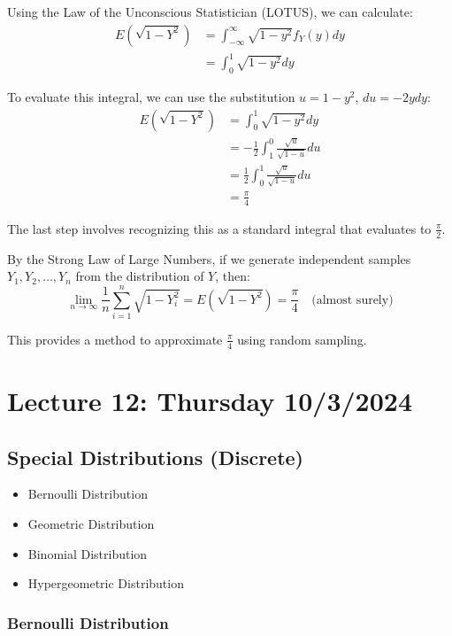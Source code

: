 \documentclass{article}
\begin{document}
    Using the Law of the Unconscious Statistician (LOTUS), we can calculate:
    \begin{align*}
    E(\sqrt{1-Y^2}) &= \int_{-\infty}^{\infty} \sqrt{1-y^2} f_Y(y) dy \\
    &= \int_{0}^{1} \sqrt{1-y^2} dy
    \end{align*}

    To evaluate this integral, we can use the substitution $u = 1-y^2$, $du = -2y dy$:
    \begin{align*}
    E(\sqrt{1-Y^2}) &= \int_{0}^{1} \sqrt{1-y^2} dy \\
    &= -\frac{1}{2} \int_{1}^{0} \frac{\sqrt{u}}{\sqrt{1-u}} du \\
    &= \frac{1}{2} \int_{0}^{1} \frac{\sqrt{u}}{\sqrt{1-u}} du \\
    &= \frac{\pi}{4}
    \end{align*}

    The last step involves recognizing this as a standard integral that evaluates to $\frac{\pi}{2}$.

    By the Strong Law of Large Numbers, if we generate independent samples $Y_1, Y_2, \ldots, Y_n$ from the distribution of $Y$, then:
    \[
    \lim_{n \to \infty} \frac{1}{n} \sum_{i=1}^{n} \sqrt{1-Y_i^2} = E(\sqrt{1-Y^2}) = \frac{\pi}{4} \quad \text{(almost surely)}
    \]

    This provides a method to approximate $\frac{\pi}{4}$ using random sampling.

    \pagebreak


    \section*{Lecture 12: Thursday 10/3/2024}

    \subsection*{Special Distributions (Discrete)}

    \begin{itemize}
        \item Bernoulli Distribution
        \item Geometric Distribution
        \item Binomial Distribution
        \item Hypergeometric Distribution
    \end{itemize}

    \subsubsection*{Bernoulli Distribution}
\end{document}
